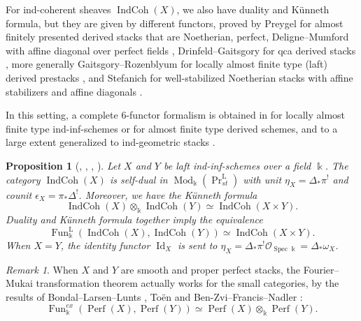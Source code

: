 \documentclass[11pt]{amsart}
\numberwithin{equation}{section}
\theoremstyle{plain}
\newtheorem{Prop}[prop]{Proposition}
\theoremstyle{definition}
\theoremstyle{remark}
\newtheorem{RMK}[rmk]{Remark}
\newcommand{\cO} { {\mathcal{O}}}
\newcommand{\Id}{{\operatorname{Id}}}
\newcommand{\Mod}{{\operatorname{Mod}}}
\newcommand\Fun{\operatorname{Fun}}
\newcommand\PrLst{  {  \operatorname{Pr}^{\operatorname{L} }_{st} } }
\newcommand\IndCoh{\operatorname{IndCoh}}
\newcommand\Perf{\operatorname{Perf}}
\newcommand\Spec{\operatorname{Spec}}
\begin{document}
For ind-coherent sheaves $\IndCoh(X)$, we also have duality and K\"unneth formula, but they are given by different functors, proved by Preygel for almost finitely presented derived stacks that are Noetherian, perfect, Deligne--Mumford with affine diagonal over perfect fields \cite[Appendix B]{Preygel}, Drinfeld--Gaitsgory for qca derived stacks \cite[Section 3 \& 4]{Drinfeld-Gaitsgory}, more generally Gaitsgory--Rozenblyum for locally almost finite type (laft) derived prestacks \cite[Chapter 5 Theorem 4.2.5]{Gaitsgory-Rozenblyum} \cite[Chapter 3 \S 5, ~\S 6]{Gaitsgory-RozenblyumII}, and Stefanich for well-stabilized Noetherian stacks with affine stabilizers and affine diagonals \cite[Theorem 1.0.4]{stefanich2025dualizability_deriveds_stack}.

In this setting, a complete 6-functor formalism is obtained in \cite[Part~II Chapter 5 Theorem 4.1.2 \& Part~III Chapter 8 Theorem 6.1.5]{Gaitsgory-Rozenblyum} for locally almost finite type ind-inf-schemes or \cite[Section 8.7]{Six-FunctorScholze} for almost finite type derived schemes, and to a large extent generalized to ind-geometric stacks \cite{CautisWilliams}.

    \begin{Prop}[{\cite[Proposition~B.3.2]{Preygel}, \cite[Theorem 3.3.5 \& Corollary 4.2.3]{Drinfeld-Gaitsgory}, \cite[Part~II Ch.~5 Thm.~4.2.5]{Gaitsgory-Rozenblyum}, \cite[ Ch.~3, Theorem~6.2.2 and ~\S6.2.6]{Gaitsgory-RozenblyumII}}]
    Let $X$ and $Y$ be laft ind-inf-schemes over a field $\Bbbk$. The category $\IndCoh(X)$ is self-dual in $\Mod_\Bbbk(\PrLst)$ with unit $\eta_X = \Delta_*\pi^!$ and counit $\epsilon_X = \pi_*\Delta^!$. Moreover, we have the K\"unneth formula
    \[\IndCoh(X) \otimes_\Bbbk \IndCoh(Y) \simeq \IndCoh(X \times Y).\]
    Duality and K\"unneth formula together imply the equivalence
    \[\Fun^\mathrm{L}_\Bbbk(\IndCoh(X), \IndCoh(Y)) \simeq \IndCoh(X \times Y).\]
    When $X = Y$, the identity functor $\Id_X$ is sent to $\eta_X = \Delta_*\pi^!\cO_{\Spec \Bbbk} = \Delta_*\omega_X$.
\end{Prop}


\begin{RMK}
When $X$ and $Y$ are smooth and proper perfect stacks, the Fourier--Mukai transformation theorem actually works for the small categories, by the results of Bondal--Larsen--Lunts \cite{Bondal-Larsen-Lunts}, To\"en \cite[Corollary 1.8]{Toen_morita} and Ben-Zvi--Francis--Nadler \cite[Theorem 1.2]{Ben-Zvi-Francis-Nadler}:
\[\Fun^{ex}_\Bbbk(\Perf(X), \Perf(Y)) \simeq \Perf(X) \otimes_\Bbbk \Perf(Y).\]
\end{RMK}
\end{document}
